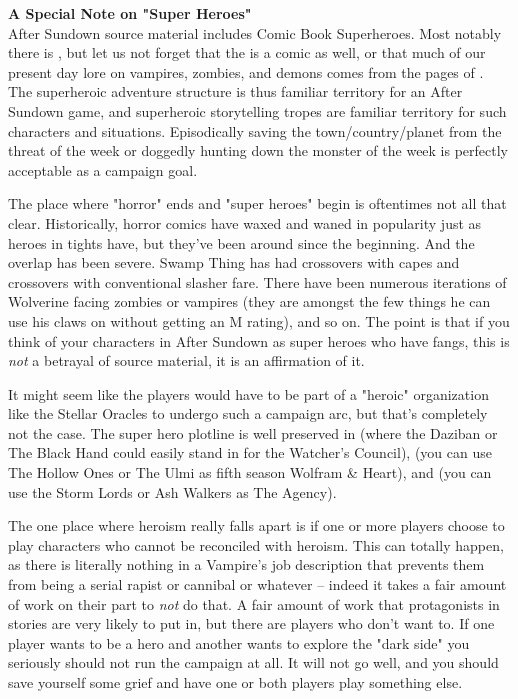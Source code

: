\medskip
\textbf{A Special Note on "Super Heroes"}\\
After Sundown source material includes Comic Book Superheroes. Most notably there is , but let us not forget that the  is a comic as well, or that much of our present day lore on vampires, zombies, and demons comes from the pages of . The superheroic adventure structure is thus familiar territory for an After Sundown game, and superheroic storytelling tropes are familiar territory for such characters and situations. Episodically saving the town/country/planet from the threat of the week or doggedly hunting down the monster of the week is perfectly acceptable as a campaign goal.

The place where "horror" ends and "super heroes" begin is oftentimes not all that clear. Historically, horror comics have waxed and waned in popularity just as heroes in tights have, but they've been around since the beginning. And the overlap has been severe. Swamp Thing has had crossovers with capes and crossovers with conventional slasher fare. There have been numerous iterations of Wolverine facing zombies or vampires (they are amongst the few things he can use his claws on without getting an M rating), and so on. The point is that if you think of your characters in After Sundown as super heroes who have fangs, this is \textit{not} a betrayal of source material, it is an affirmation of it.

It might seem like the players would have to be part of a "heroic" organization like the Stellar Oracles to undergo such a campaign arc, but that's completely not the case. The super hero plotline is well preserved in  (where the Daziban or The Black Hand could easily stand in for the Watcher's Council),  (you can use The Hollow Ones or The Ulmi as fifth season Wolfram \& Heart), and  (you can use the Storm Lords or Ash Walkers as The Agency).
\medskip

The one place where heroism really falls apart is if one or more players choose to play characters who cannot be reconciled with heroism. This can totally happen, as there is literally nothing in a Vampire's job description that prevents them from being a serial rapist or cannibal or whatever -- indeed it takes a fair amount of work on their part to \textit{not} do that. A fair amount of work that protagonists in stories are very likely to put in, but there are players who don't want to. If one player wants to be a hero and another wants to explore the "dark side" you seriously should not run the campaign at all. It will not go well, and you should save yourself some grief and have one or both players play something else.

